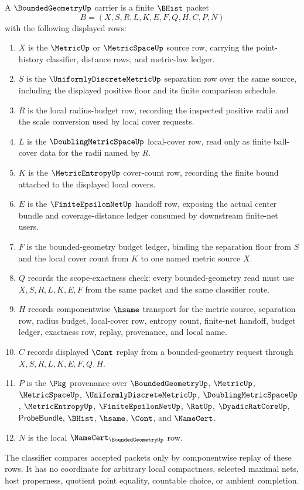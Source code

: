 \begin{definition}
\label{def:bounded-geometry-carrier}
A $\BoundedGeometryUp$ carrier is a finite $\BHist$ packet
$$
B=(X,S,R,L,K,E,F,Q,H,C,P,N)
$$
with the following displayed rows:
\begin{enumerate}
\item $X$ is the $\MetricUp$ or $\MetricSpaceUp$ source row, carrying the point-history classifier, distance rows, and metric-law ledger.
\item $S$ is the $\UniformlyDiscreteMetricUp$ separation row over the same source, including the displayed positive floor and its finite comparison schedule.
\item $R$ is the local radius-budget row, recording the inspected positive radii and the scale conversion used by local cover requests.
\item $L$ is the $\DoublingMetricSpaceUp$ local-cover row, read only as finite ball-cover data for the radii named by $R$.
\item $K$ is the $\MetricEntropyUp$ cover-count row, recording the finite bound attached to the displayed local covers.
\item $E$ is the $\FiniteEpsilonNetUp$ handoff row, exposing the actual center bundle and coverage-distance ledger consumed by downstream finite-net users.
\item $F$ is the bounded-geometry budget ledger, binding the separation floor from $S$ and the local cover count from $K$ to one named metric source $X$.
\item $Q$ records the scope-exactness check: every bounded-geometry read must use $X,S,R,L,K,E,F$ from the same packet and the same classifier route.
\item $H$ records componentwise $\hsame$ transport for the metric source, separation row, radius budget, local-cover row, entropy count, finite-net handoff, budget ledger, exactness row, replay, provenance, and local name.
\item $C$ records displayed $\Cont$ replay from a bounded-geometry request through $X,S,R,L,K,E,F,Q,H$.
\item $P$ is the $\Pkg$ provenance over $\BoundedGeometryUp$, $\MetricUp$, $\MetricSpaceUp$, $\UniformlyDiscreteMetricUp$, $\DoublingMetricSpaceUp$, $\MetricEntropyUp$, $\FiniteEpsilonNetUp$, $\RatUp$, $\DyadicRatCoreUp$, $\mathsf{ProbeBundle}$, $\BHist$, $\hsame$, $\Cont$, and $\NameCert$.
\item $N$ is the local $\NameCert_{\BoundedGeometryUp}$ row.
\end{enumerate}
The classifier compares accepted packets only by componentwise replay of these rows. It has no coordinate for arbitrary local compactness, selected maximal nets, host properness, quotient point equality, countable choice, or ambient completion.
\end{definition}

